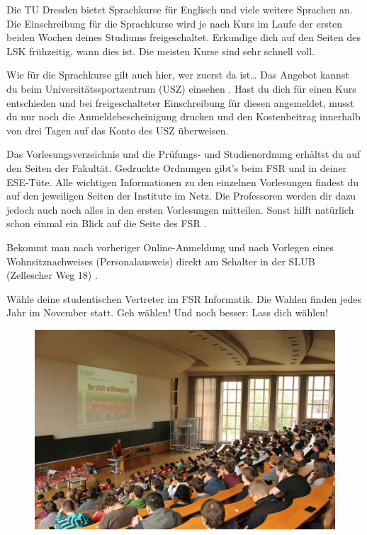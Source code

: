 \begin{itemize}[leftmargin=*]
Die TU Dresden bietet Sprachkurse für Englisch und viele weitere Sprachen an.
Die Einschreibung für die Sprachkurse wird je nach Kurs im Laufe der ersten
beiden Wochen deines Studiums freigeschaltet. Erkundige dich auf den Seiten des
LSK  frühzeitig, wann dies ist. Die
meisten Kurse sind sehr schnell voll.

Wie für die Sprachkurse gilt auch hier, wer zuerst da ist\ldots{} Das Angebot
kannst du beim Universitätssportzentrum (USZ) einsehen
. Hast du dich für einen Kurs entschieden und
bei freigeschalteter Einschreibung für diesen angemeldet, musst du nur noch die
Anmeldebescheinigung drucken und den Kostenbeitrag innerhalb von drei Tagen auf
das Konto des USZ überweisen.

\newpage

Das Vorlesungsverzeichnis
 und die Prüfungs- und
Studienordnung
 erhältst du
auf den Seiten der Fakultät. Gedruckte Ordnungen gibt's beim FSR und in deiner
ESE-Tüte. Alle wichtigen Informationen zu den einzelnen Vorlesungen findest du
auf den jeweiligen Seiten der Institute im Netz.  Die Professoren werden dir
dazu jedoch auch noch alles in den ersten Vorlesungen mitteilen. Sonst hilft
natürlich schon einmal ein Blick auf die Seite des FSR
.

Bekommt man nach vorheriger Online-Anmeldung und nach Vorlegen eines
Wohnsitznachweises (Personalausweis) direkt am Schalter in der SLUB (Zellescher
Weg 18) .

Wähle deine studentischen Vertreter im FSR Informatik. Die Wahlen finden jedes
Jahr im November statt. Geh wählen! Und noch besser: Lass dich wählen!

\vfill

\begin{figure}[h!]
\centering
\includegraphics[width=0.9\linewidth]{img/ese2013/barschoe.jpg}
\end{figure}


\end{itemize}
